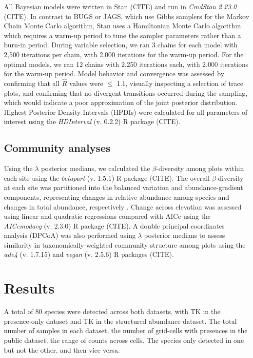 \documentclass[preprint,review,times,12pt]{elsarticle}
\begin{document}
All Bayesian models were written in Stan (CITE) and run in \emph{CmdStan 2.23.0} (CITE). In contrast to BUGS or JAGS, which use Gibbs samplers for the Markov Chain Monte Carlo algorithm, Stan uses a Hamiltonian Monte Carlo algorithm which requires a warm-up period to tune the sampler parameters rather than a burn-in period. During variable selection, we ran 3 chains for each model with 2,500 iterations per chain, with 2,000 iterations for the warm-up period. For the optimal models, we ran 12 chains with 2,250 iterations each, with 2,000 iterations for the warm-up period. Model behavior and convergence was assessed by confirming that all $\hat{R}$ values were $\leq$ 1.1, visually inspecting a selection of trace plots, and confirming that no divergent transitions occurred during the sampling, which would indicate a poor approximation of the joint posterior distribution. Highest Posterior Density Intervals (HPDIs) were calculated for all parameters of interest using the \emph{HDInterval} (v. 0.2.2) R package (CITE).


\subsection{Community analyses}
Using the $\lambda$ posterior medians, we calculated the $\beta$-diversity among plots within each site using the \emph{betapart} (v. 1.5.1) R package (CITE). The overall $\beta$-diversity at each site was partitioned into the balanced variation and abundance-gradient components, representing changes in relative abundance among species and changes in total abundance, respectively \citep{Baselga2017}. Change across elevation was assessed using linear and quadratic regressions compared with AICc using the \emph{AICcmodavg} (v. 2.3.0) R package (CITE). A double principal coordinates analysis (DPCoA) was also performed using $\lambda$ posterior medians to assess similarity in taxonomically-weighted community structure among plots \citep{Dray2015,Pavoine2019} using the \emph{ade4} (v. 1.7.15) and \emph{vegan} (v. 2.5.6) R packages (CITE). 




\section{Results}
\label{S:3}
A total of 80 species were detected across both datasets, with TK in the presence-only dataset and TK in the structured abundance dataset. The total number of samples in each dataset, the number of grid-cells with presences in the public dataset, the range of counts across cells. The species only detected in one but not the other, and then vice versa.
\end{document}
